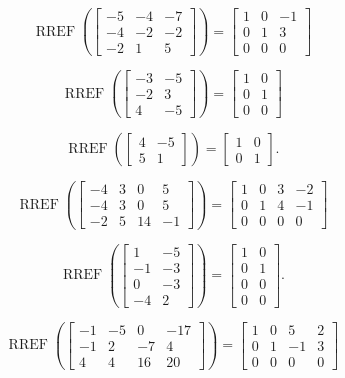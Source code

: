 \documentclass{article}
\DeclareMathOperator{\RREF}{RREF}
\begin{document}
\[
\RREF\left( \begin{bmatrix} -5 &  -4 & -7 \\ -4 & -2 & -2 \\ -2 & 1 & 5 \end{bmatrix} \right) 
= \begin{bmatrix} 1 &  0 & -1 \\ 0 & 1 & 3 \\ 0 & 0 & 0  \end{bmatrix}
\]

\[
\RREF \left( \begin{bmatrix} -3 & -5 \\ -2 & 3 \\ 4 & -5 \end{bmatrix} \right)
= \begin{bmatrix} 1 & 0 \\ 0 & 1 \\ 0 & 0 \end{bmatrix}
\]

\[
\RREF\left(\begin{bmatrix} 4 & -5 \\ 5 & 1 \end{bmatrix}\right)
=\begin{bmatrix}1 & 0 \\ 0 & 1 \end{bmatrix}.
\]

\[
\RREF\left(\begin{bmatrix} -4 & 3 & 0 & 5 \\ -4 & 3 & 0 & 5 \\ -2 & 5 & 14 & -1 \end{bmatrix}\right)
= \begin{bmatrix} 1 & 0 & 3 & -2 \\ 0 & 1 & 4 & -1 \\ 0 & 0 & 0 & 0\end{bmatrix}
\]


\[
\RREF\left(\begin{bmatrix} 1 & -5 \\ -1 & -3 \\ 0 & -3 \\ -4 & 2 \end{bmatrix}\right)
=\begin{bmatrix}1 & 0 \\ 0 & 1 \\ 0 & 0 \\ 0 & 0  \end{bmatrix}.
\]

\[
\RREF\left(\begin{bmatrix} -1 & -5 & 0 & -17 \\ -1 & 2 & -7 & 4 \\ 4 & 4 & 16 & 20 \end{bmatrix}\right)
= \begin{bmatrix} 1 & 0  & 5 & 2 \\ 0 & 1 & -1 & 3 \\ 0 & 0 & 0 & 0 \end{bmatrix}
\]
\end{document}
